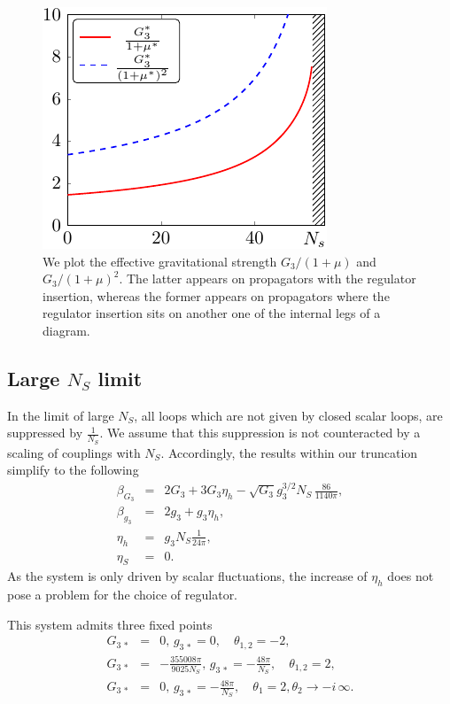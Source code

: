 \documentclass[11pt]{book} %
\newcommand{\bea}{\begin{eqnarray}}
\newcommand{\eea}{\end{eqnarray}}
\begin{document}
%
\begin{figure}[!t]
\includegraphics[width=\linewidth]{NS_findiff_all_hss_eff_g_only_ns-crop.pdf}
\caption{\label{fig:effectiveG} We plot the effective gravitational
  strength $G_3/(1+\mu)$ and $G_3/(1+\mu)^2$. The latter appears
  on propagators with the regulator insertion, whereas the former
  appears on propagators where the regulator insertion sits on another
  one of the internal legs of a diagram.}
\end{figure}
%
%
\subsection{Large $N_S$ limit}
%
In the limit of large $N_S$, all loops which are not given by closed
scalar loops, are suppressed by $\frac{1}{N_S}$. We assume that this
suppression is not counteracted by a scaling of couplings with $N_S$.
Accordingly, the results within our truncation simplify to the
following
%
\bea
\beta_{G_3} &=& 2 G_3 + 3 G_3 \eta_h - \sqrt{G_3}g_3^{3/2}N_S\, \frac{86}{1140 \pi},\\
\beta_{g_3}&=& 2 g_3 + g_3 \eta_h,\\
\eta_h &=& g_3 N_S \frac{1}{24 \pi},\\
\eta_S&=&0.  \eea
%
As the system is only driven by scalar fluctuations, the increase of
$\eta_h$ does not pose a problem for the choice of regulator.

This system admits three fixed points \bea
G_{3\, \ast}&=&0,\, g_{3\, \ast}= 0,\quad \theta_{1,2} =-2,\\
G_{3\, \ast}&=&-\frac{355008 \pi}{9025 N_S},\, g_{3\, \ast}= -\frac{48 \pi}{N_S},\quad \theta_{1,2} =2,\\
G_{3\, \ast}&=&0,\, g_{3\, \ast}= -\frac{48 \pi}{N_S},\quad
\theta_1=2, \theta_2 \rightarrow - i\, \infty .  \eea
\end{document}
